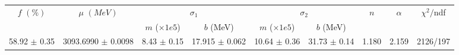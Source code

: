 \begin{tabular}{c|c|cc|cc|c|c||c}
 \multirow{2}{*}{$f$ $(\%)$} & \multirow{2}{*}{$\mu$ $(MeV)$} & \multicolumn{2}{|c|}{$\sigma_1$} & \multicolumn{2}{|c|}{$\sigma_2$}  & \multirow{2}{*}{$n$} & \multirow{2}{*}{$\alpha$} & \multirow{2}{*}{$\chi^2/$ndf} \\
 & & $m$ ($\times1e5$) & $b$ (MeV) & $m$ ($\times1e5$) & $b$ (MeV) & & & \\
\hline
58.92 $\pm$ 0.35 & 3093.6990 $\pm$ 0.0098 & 8.43 $\pm$ 0.15 & 17.915 $\pm$ 0.062 & 10.64 $\pm$ 0.36 & 31.73 $\pm$ 0.14 & 1.180 & 2.159 & 2126/197\\
\end{tabular}
